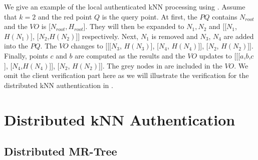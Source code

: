 We give an example of the local authenticated kNN processing using . Assume that $k=2$ and the red point $Q$ is the query point. At first, the $PQ$ contains $N_{root}$ and the $VO$ is [$N_{root}, H_{root}$]. They will then be expanded to $N_1, N_2$ and [[$N_{1}$,$H(N_{1})$], [$N_{2}$,$H(N_{2})$]] respectively. Next, $N_{1}$ is removed and $N_{3}$, $N_{4}$ are added into the $PQ$. The $VO$ changes to [[[$N_{3}$, $H(N_{3})$], [$N_{4}$, $H(N_{4})$]], [$N_{2}$, $H(N_{2})$]]. Finally, points $c$ and $b$ are computed as the results and the $VO$ updates to [[[$a$,$b$,$c$], [$N_{4}$,$H(N_{4})$]], [$N_{2}$, $H(N_{2})$]]. The grey nodes in  are included in the $VO$. We omit the client verification part here as we will illustrate the verification for the distributed kNN authentication in .

\section{Distributed {kNN} Authentication}\label{sec:knn:distributed-knn}

\subsection{Distributed MR-Tree}

